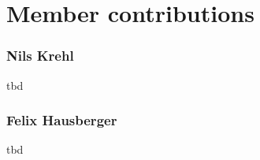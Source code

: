 \section*{Member contributions}

\subsubsection*{Nils Krehl}
tbd

\subsubsection*{Felix Hausberger}
tbd
